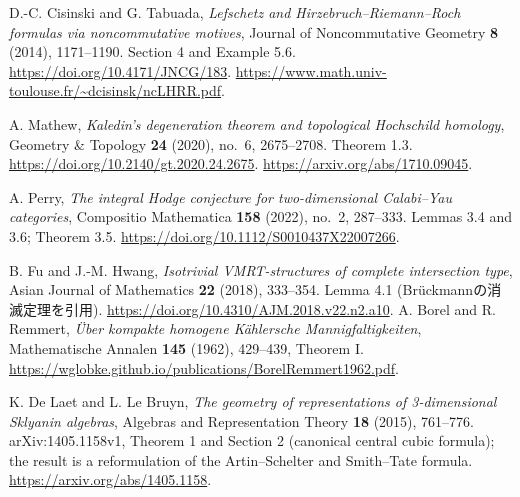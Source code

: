 D.-C. Cisinski and G. Tabuada,
\emph{Lefschetz and Hirzebruch--Riemann--Roch formulas via noncommutative motives},
Journal of Noncommutative Geometry \textbf{8} (2014), 1171--1190.
Section 4 and Example 5.6.
\url{https://doi.org/10.4171/JNCG/183}.
\url{https://www.math.univ-toulouse.fr/~dcisinsk/ncLHRR.pdf}.

A. Mathew,
\emph{Kaledin's degeneration theorem and topological Hochschild homology},
Geometry \& Topology \textbf{24} (2020), no.~6, 2675--2708.
Theorem 1.3.
\url{https://doi.org/10.2140/gt.2020.24.2675}.
\url{https://arxiv.org/abs/1710.09045}.

A. Perry,
\emph{The integral Hodge conjecture for two-dimensional Calabi--Yau categories},
Compositio Mathematica \textbf{158} (2022), no.~2, 287--333.
Lemmas 3.4 and 3.6; Theorem 3.5.
\url{https://doi.org/10.1112/S0010437X22007266}.

B. Fu and J.-M. Hwang,
\emph{Isotrivial VMRT-structures of complete intersection type},
Asian Journal of Mathematics \textbf{22} (2018), 333--354.
Lemma 4.1 (Br\"uckmannの消滅定理を引用).
\url{https://doi.org/10.4310/AJM.2018.v22.n2.a10}.
A. Borel and R. Remmert,
\emph{\"Uber kompakte homogene K\"ahlersche Mannigfaltigkeiten},
Mathematische Annalen \textbf{145} (1962), 429--439, Theorem I.
\url{https://wglobke.github.io/publications/BorelRemmert1962.pdf}.

K. De Laet and L. Le Bruyn,
\emph{The geometry of representations of 3-dimensional Sklyanin algebras},
Algebras and Representation Theory \textbf{18} (2015), 761--776.
arXiv:1405.1158v1, Theorem 1 and Section 2 (canonical central cubic formula);
the result is a reformulation of the Artin--Schelter and Smith--Tate formula.
\url{https://arxiv.org/abs/1405.1158}.
